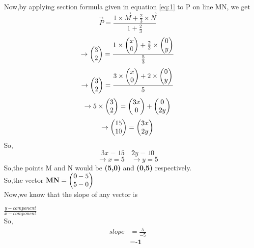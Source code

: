 \documentclass[journal,12pt,twocolumn]{IEEEtran}
\begin{document}
Now,by applying section formula given in equation \eqref{eq:1} to P on line MN, we get\\
\begin{equation*}
    \vec{P}=\frac{1\times \vec{M}+\frac{2}{3}\times \vec{N}}{1+\frac{2}{3}}
\end{equation*}
\begin{equation*}
    \rightarrow\begin{pmatrix}3 \\ 2\end{pmatrix}=\frac{1\times \begin{pmatrix}x\\0\end{pmatrix}+\frac{2}{3}\times \begin{pmatrix}0\\y\end{pmatrix}}{\frac{5}{3}}
\end{equation*}
\begin{equation*}
\rightarrow\begin{pmatrix}3 \\ 2\end{pmatrix}=\frac{3\times \begin{pmatrix}x\\0\end{pmatrix}+2\times \begin{pmatrix}0\\y\end{pmatrix}}{5}
\end{equation*}
\begin{equation*}
    \rightarrow 5\times \begin{pmatrix}3\\2\end{pmatrix}=\begin{pmatrix}3x\\0\end{pmatrix}+\begin{pmatrix}0\\2y\end{pmatrix}
\end{equation*}
\begin{equation}
\rightarrow\begin{pmatrix}15\\10\end{pmatrix}=\begin{pmatrix}3x\\2y\end{pmatrix}  \nonumber
\end{equation}
So,
\begin{equation*}
3x=15\quad 2y=10
\end{equation*}
\begin{equation}
\rightarrow x=5\quad \rightarrow y=5       \nonumber
\end{equation}
So,the points M and N would be \textbf{(5,0)} and \textbf{(0,5)} respectively.\\

So,the vector $\mathbf{MN}=\begin{pmatrix}0-5\\5-0\end{pmatrix}$\\

Now,we know that the slope of any vector is

    $\frac{y-component}{x-component}$\\

So,
 \begin{align}
  slope &=\frac{5}{-5}             \nonumber        \\     
  &=\textbf{-1}                    \nonumber
\end{align}
\end{document}
